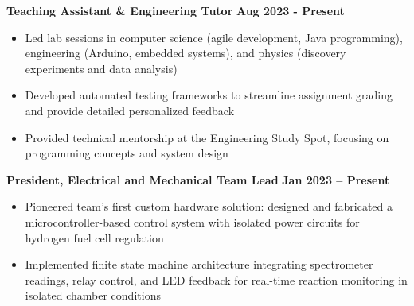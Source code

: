 \documentclass{article}
\begin{document}
\textbf{Teaching Assistant \& Engineering Tutor} \hfill \textbf{Aug 2023 - Present}
\begin{itemize}[noitemsep,topsep=2pt]
    \item Led lab sessions in computer science (agile development, Java programming), engineering (Arduino, embedded systems), and physics (discovery experiments and data analysis)
    \item Developed automated testing frameworks to streamline assignment grading and provide detailed personalized feedback
    \item Provided technical mentorship at the Engineering Study Spot, focusing on programming concepts and system design
\end{itemize}


 \hfill {}

\textbf{President, Electrical and Mechanical Team Lead} \hfill \textbf{Jan 2023 – Present}
\begin{itemize}[noitemsep,topsep=2pt]
	\item Pioneered team's first custom hardware solution: designed and fabricated a microcontroller-based control system with isolated power circuits for hydrogen fuel cell regulation
    \item Implemented finite state machine architecture integrating spectrometer readings, relay control, and LED feedback for real-time reaction monitoring in isolated chamber conditions
\end{itemize}




\end{document}
